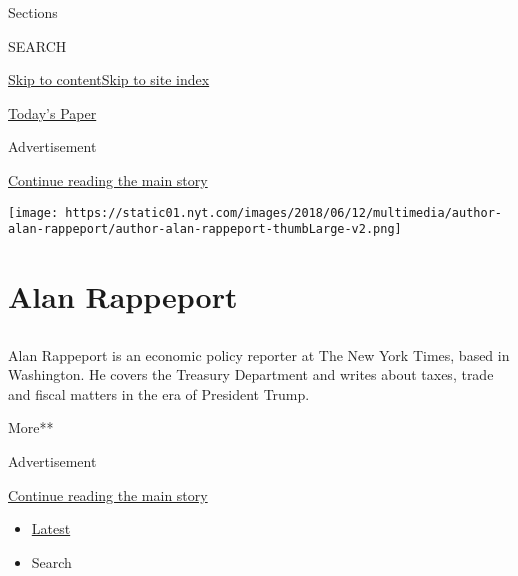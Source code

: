 Sections

SEARCH

\protect\hyperlink{site-content}{Skip to
content}\protect\hyperlink{site-index}{Skip to site index}

\href{https://myaccount.nytimes.com/auth/login?response_type=cookie\&client_id=vi}{}

\href{https://www.nytimes.com/section/todayspaper}{Today's Paper}

Advertisement

\protect\hyperlink{after-top}{Continue reading the main story}

\texttt{[image: https://static01.nyt.com/images/2018/06/12/multimedia/author-alan-rappeport/author-alan-rappeport-thumbLarge-v2.png]}

\hypertarget{alan-rappeport}{%
\section{Alan Rappeport}\label{alan-rappeport}}

\subsection{}

Alan Rappeport is an economic policy reporter at The New York Times,
based in Washington. He covers the Treasury Department and writes about
taxes, trade and fiscal matters in the era of President Trump.

More**

Advertisement

\protect\hyperlink{after-mid1}{Continue reading the main story}

\begin{itemize}
\tightlist
\item
  \protect\hyperlink{stream-panel}{Latest}
\item
  Search
\end{itemize}


